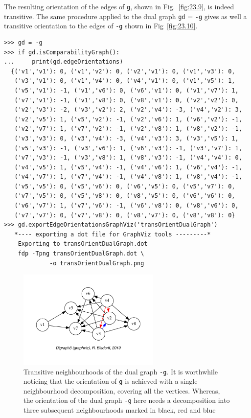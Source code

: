 The resulting orientation of the edges of \texttt{g}, shown in Fig.~\vref{fig:23.9}, is indeed transitive. The same procedure applied to the dual graph \texttt{gd} = \texttt{-g} gives as well a transitive orientation to the edges of \texttt{-g} shown in Fig~\vref{fig:23.10}.
\begin{lstlisting}[basicstyle=\ttfamily\scriptsize]
>>> gd = -g
>>> if gd.isComparabilityGraph():
...     print(gd.edgeOrientations) 
  {('v1','v1'): 0, ('v1','v2'): 0, ('v2','v1'): 0, ('v1','v3'): 0,
   ('v3','v1'): 0, ('v1','v4'): 0, ('v4','v1'): 0, ('v1','v5'): 1,
   ('v5','v1'): -1, ('v1','v6'): 0, ('v6','v1'): 0, ('v1','v7'): 1,
   ('v7','v1'): -1, ('v1','v8'): 0, ('v8','v1'): 0, ('v2','v2'): 0,
   ('v2','v3'): -2, ('v3','v2'): 2, ('v2','v4'): -3, ('v4','v2'): 3,
   ('v2','v5'): 1, ('v5','v2'): -1, ('v2','v6'): 1, ('v6','v2'): -1,
   ('v2','v7'): 1, ('v7','v2'): -1, ('v2','v8'): 1, ('v8','v2'): -1,
   ('v3','v3'): 0, ('v3','v4'): -3, ('v4','v3'): 3, ('v3','v5'): 1,
   ('v5','v3'): -1, ('v3','v6'): 1, ('v6','v3'): -1, ('v3','v7'): 1,
   ('v7','v3'): -1, ('v3','v8'): 1, ('v8','v3'): -1, ('v4','v4'): 0,
   ('v4','v5'): 1, ('v5','v4'): -1, ('v4','v6'): 1, ('v6','v4'): -1,
   ('v4','v7'): 1, ('v7','v4'): -1, ('v4','v8'): 1, ('v8','v4'): -1,
   ('v5','v5'): 0, ('v5','v6'): 0, ('v6','v5'): 0, ('v5','v7'): 0,
   ('v7','v5'): 0, ('v5','v8'): 0, ('v8','v5'): 0, ('v6','v6'): 0,
   ('v6','v7'): 1, ('v7','v6'): -1, ('v6','v8'): 0, ('v8','v6'): 0,
   ('v7','v7'): 0, ('v7','v8'): 0, ('v8','v7'): 0, ('v8','v8'): 0}
>>> gd.exportEdgeOrientationsGraphViz('transOrientDualGraph')
   *---- exporting a dot file for GraphViz tools ---------*
    Exporting to transOrientDualGraph.dot
    fdp -Tpng transOrientDualGraph.dot \
             -o transOrientDualGraph.png
\end{lstlisting}
\begin{figure}[h]
\sidecaption[t]
\includegraphics[width=7cm]{Figures/23-10-transOrientDualGraph.pdf}
\caption{Transitive neighbourhoods of the dual graph \texttt{-g}. It is worthwhile noticing that the orientation of \texttt{g} is achieved with a single neighbourhood decomposition, covering all the vertices. Whereas, the orientation of the dual graph \texttt{-g} here needs a decomposition into three subsequent neighbourhoods marked in black, red and blue} 
\label{fig:23.10}       %
\end{figure}
 
